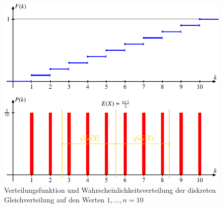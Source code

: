 \begin{figure}
\centering
\includegraphics{images/gl-2.pdf}
\caption{Verteilungsfunktion und Wahrscheinlichkeitsverteilung der diskreten
Gleichverteilung auf den Werten $1,\dots,n=10$
\label{diskrete-gleichverteilung}}
\end{figure}


